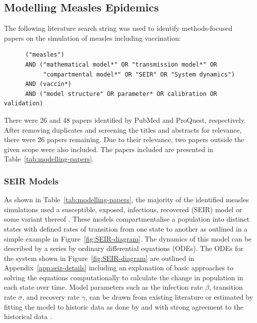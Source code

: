 \documentclass{article}
\begin{document}
\subsection{Modelling Measles Epidemics}
\label{sec:modelling-papers}
The following literature search string was used to identify methods-focused papers on the simulation of measles including vaccination:
\vspace{-5px}
\begin{verbatim}
      ("measles") 
      AND ("mathematical model*" OR "transmission model*" OR 
           "compartmental model*" OR "SEIR" OR "System dynamics")
      AND (vaccin*) 
      AND ("model structure" OR parameter* OR calibration OR validation)
\end{verbatim}
There were 26 and 48 papers identified by PubMed and ProQuest, respectively. After removing duplicates and screening the titles and abstracts for relevance, there were 26 papers remaining. Due to their relevance, two papers outside the given scope were also included. The papers included are presented in Table~\ref{tab:modelling-papers}.

\subsubsection{SEIR Models}

As shown in Table~\ref{tab:modelling-papers}, the majority of the identified measles simulations used a susceptible, exposed, infectious, recovered (SEIR) model or some variant thereof \cite{peter2026assessing, chukwu2026forecasting, peter2025modelling, liu2025modelling, sinigirira2025assessing,  farhan2025fractional, fahimi2025mathematical, khan2025deterministic, sbarra2025fitting, robert2024long, rasit2024mathematical, berhe2024modelling, ibrahim2024threshold, chatterjee2024compartmental, kuddus2023analysis, ibrahim2023stability, farman2023modelling, alemneh2023modelling, pokharel2022modeling, el2022mathematical, shen2022impact, Kuddus2021, MENKIR20212894}. These models compartmentalise a population into distinct states with defined rates of transition from one state to another as outlined in a simple example in Figure~\ref{fig:SEIR-diagram}. The dynamics of this model can be described by a series by ordinary differential equations (ODEs). The ODEs for the system shown in Figure~\ref{fig:SEIR-diagram} are outlined in Appendix~\ref{app:seir-details} including an explanation of basic approaches to solving the equations computationally to calculate the change in population in each state over time. Model parameters such as the infection rate $\beta$, transition rate $\sigma$, and recovery rate $\gamma$, can be drawn from existing literature or estimated by fitting the model to historic data as done by \citeauthor{liu2025modelling} and \citeauthor{chukwu2026forecasting} with strong agreement to the historical data \cite{liu2025modelling, chukwu2026forecasting}.
\end{document}
